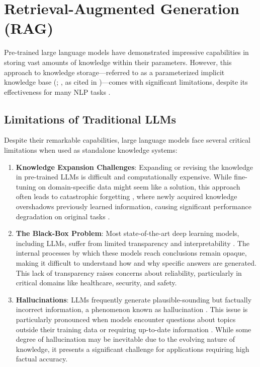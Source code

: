 \section{Retrieval-Augmented Generation (RAG)}
\label{sec:rag}
Pre-trained large language models have demonstrated impressive capabilities in storing vast amounts of knowledge within their parameters. However, this approach to knowledge storage---referred to as a parameterized implicit knowledge base (\citealp{raffel2023exploringlimitstransferlearning}; \citealp{roberts2020knowledgepackparameterslanguage}, as cited in \citealp{lewis2021retrievalaugmentedgenerationknowledgeintensivenlp})---comes with significant limitations, despite its effectiveness for many NLP tasks \citep{9412102}.

\subsection{Limitations of Traditional LLMs}
\label{sec:llm-limitations}
Despite their remarkable capabilities, large language models face several critical limitations when used as standalone knowledge systems:

\begin{enumerate}
    \item \textbf{Knowledge Expansion Challenges}: Expanding or revising the knowledge in pre-trained LLMs is difficult and computationally expensive. While fine-tuning on domain-specific data might seem like a solution, this approach often leads to catastrophic forgetting \citep{kaushik2021understandingcatastrophicforgettingremembering}, where newly acquired knowledge overshadows previously learned information, causing significant performance degradation on original tasks \citep{liu2024catastrophicforgettingintegratinggeneral}.
    
    \item \textbf{The Black-Box Problem}: Most state-of-the-art deep learning models, including LLMs, suffer from limited transparency and interpretability \citep{blackboxai}. The internal processes by which these models reach conclusions remain opaque, making it difficult to understand how and why specific answers are generated. This lack of transparency raises concerns about reliability, particularly in critical domains like healthcare, security, and safety.
    
    \item \textbf{Hallucinations}: LLMs frequently generate plausible-sounding but factually incorrect information, a phenomenon known as hallucination \citep{llmhallucination}. This issue is particularly pronounced when models encounter questions about topics outside their training data or requiring up-to-date information \citep{llmhallu1}. While some degree of hallucination may be inevitable due to the evolving nature of knowledge, it presents a significant challenge for applications requiring high factual accuracy.
\end{enumerate}

